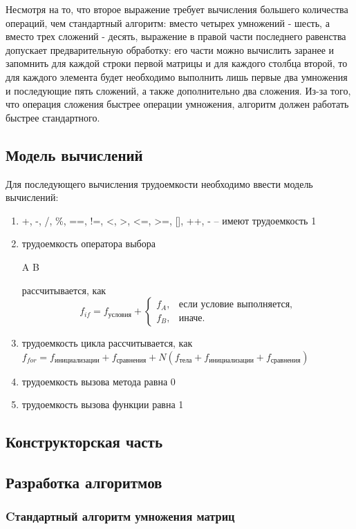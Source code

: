 \documentclass[a4paper,12pt]{article}
\begin{document}
Несмотря на то, что второе выражение требует вычисления большего количества операций, чем стандартный алгоритм: вместо четырех умножений - шесть, а вместо трех сложений - десять, выражение в правой части последнего равенства допускает предварительную обработку: его части можно вычислить заранее и запомнить для каждой строки первой матрицы и для каждого столбца второй, то для каждого элемента будет необходимо выполнить лишь первые два умножения и последующие пять сложений, а также дополнительно два сложения. Из-за того, что операция сложения быстрее операции умножения, алгоритм должен работать быстрее стандартного.

\begin{center}
\subsection{Модель вычислений}
\end{center}


Для последующего вычисления трудоемкости необходимо ввести модель вычислений:
\begin{enumerate}
\item +, -, /, \%, ==, !=, <, >, <=, >=, [], ++, \-- -- имеют трудоемкость 1
\item трудоемкость оператора выбора
			\begin{algorithmic}
				\State A
			\Else
				\State B
			\EndIf
			\end{algorithmic}
 рассчитывается, как 
			\[ f_{if} = f_{\text{условия}} + 
			\begin{cases}
				f_A, & \text{если условие выполняется,}\\
				f_B, & \text{иначе.}
			\end{cases} \]
\item трудоемкость цикла рассчитывается, как $f_{for} = f_{\text{инициализации}} + f_{\text{сравнения}} + N(f_{\text{тела}} + f_{\text{инициализации}} + f_{\text{сравнения}})$
\item трудоемкость вызова метода равна 0
\item трудоемкость вызова функции равна 1
\end{enumerate}

    \newpage

    \begin{center}
        \section{Конструкторская часть}
        \subsection{Разработка алгоритмов}
        \subsubsection{Cтандартный алгоритм умножения матриц}
    \end{center}
	
\end{document}
